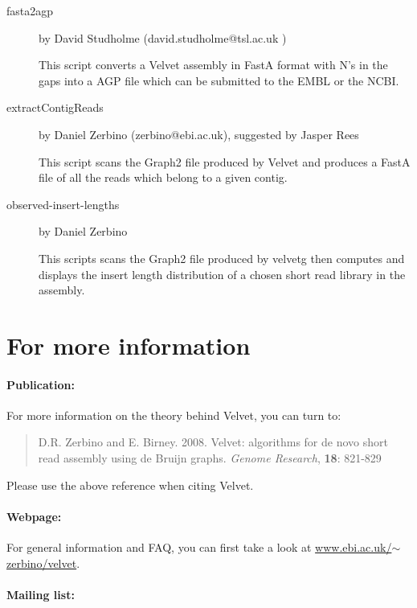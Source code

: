 \documentclass{article}
\begin{document}
\begin{description}
\item[fasta2agp] by David Studholme (david.studholme@tsl.ac.uk )

This script converts a Velvet assembly in FastA format with N's in the gaps 
into a AGP file which can be submitted to the EMBL or the NCBI.

\item[extractContigReads] by Daniel Zerbino (zerbino@ebi.ac.uk), suggested by Jasper Rees

This script scans the Graph2 file produced by Velvet and produces a FastA file
of all the reads which belong to a given contig.

\item[observed-insert-lengths] by Daniel Zerbino

This scripts scans the Graph2 file produced by velvetg then computes and displays the insert length distribution of a chosen short read library in the assembly.

\end{description}

\section{For more information}

\paragraph{Publication:}
 
 \label{sec:paper}
 
For more information on the theory behind Velvet, you can turn to:
\begin{quote}
D.R. Zerbino and E. Birney. 2008. Velvet: algorithms for de novo short read assembly using de Bruijn graphs. \emph{Genome Research}, \textbf{18}: 821-829
\end{quote}
Please use the above reference when citing Velvet.

\paragraph{Webpage:}

For general information and FAQ, you can first take a look at 
\href{http://www.ebi.ac.uk/~zerbino/velvet/}{www.ebi.ac.uk/$\sim$zerbino/velvet}.

\paragraph{Mailing list:}
\end{document}
